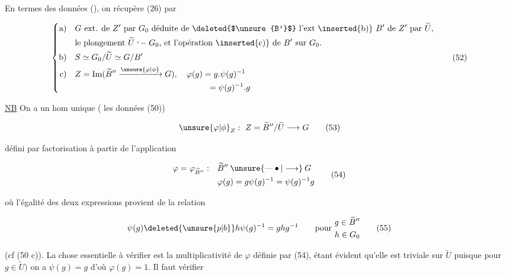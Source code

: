 En termes des données (), on récupère (26) par

\[
\left\{\begin{aligned}
\text{a)}\quad&G\ \text{ext. de $Z'$ par $G_0$ déduite de \deleted{$\unsure{B'}$} l'ext \inserted{b)} $B'$ de $Z'$ par $\widetilde U$,}\\
 &\text{le plongement $\widetilde U\mathrel{\lhook\joinrel-}G_0$, et l'opération \inserted{c)} de $B'$ sur $G_0$.}\\
\text{b)}\quad&S\simeq G_0/\widetilde U\simeq G/B'\\
\text{c)}\quad&Z=\operatorname{Im}(\widetilde B''\xrightarrow{\unsure{\varphi|\phi}}G),\quad\varphi(g)=g.\psi(g)^{-1}\\
 &\hspace{16em}=\psi(g)^{-1}.g
\end{aligned}\right.\tag*{(52)}
\]




\uline{NB} On a un hom unique ( les données (50))

\[\unsure{\varphi|\phi}_Z:\ Z=\widetilde B''/\widetilde U\longrightarrow G\tag*{(53)}\]

 défini par factorisation à partir de l'application

\[\begin{aligned}\varphi=\varphi_{\widetilde B''}:\quad&\widetilde B''\mathbin{\unsure{\text{---}\bullet|\longrightarrow}}G\\
&\varphi(g)=g\psi(g)^{-1}=\psi(g)^{-1}g
\end{aligned}\tag*{(54)}\]

où l'égalité des deux expressions provient de la relation

\[\psi(g)\deleted{\unsure{p|b}}h\psi(g)^{-1}=ghg^{-1}\qquad\text{pour }\begin{gathered}g\in\widetilde B''\\h\in G_0\end{gathered}\tag*{(55)}\]

(cf (50 c)). La chose essentielle à vérifier est la multiplicativité de $\varphi$ définie par (54), étant évident qu'elle est triviale sur $\widetilde U$ puisque pour $g\in\widetilde U)$ on a $\psi(g)=g$ d'où $\varphi(g)=1$.  Il faut vérifier

